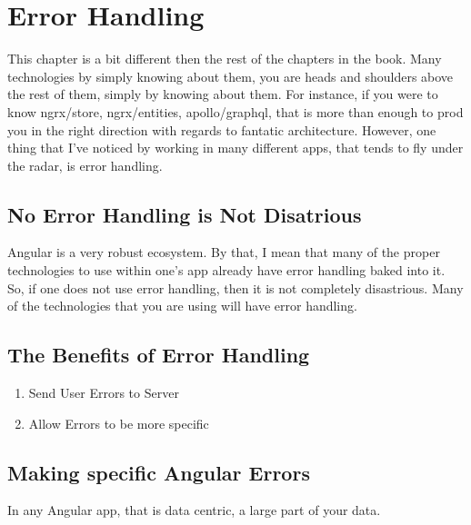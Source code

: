 \maketitle{}
\section{Error Handling}

This chapter is a bit different then the rest of the chapters in the book. Many
technologies by simply knowing about them, you are heads and shoulders above the
rest of them, simply by knowing about them. For instance, if you were to know
ngrx/store, ngrx/entities, apollo/graphql, that is more than enough to prod you
in the right direction with regards to fantatic architecture. However, one thing
that I've noticed by working in many different apps, that tends to fly under
the radar, is error handling.

\subsection{ No Error Handling is Not Disatrious }
Angular is a very robust ecosystem. By that, I mean that many of the proper
technologies to use within one's app already have error handling baked into it.
So, if one does not use error handling, then it is not completely disastrious.
Many of the technologies that you are using will have error handling.

\subsection{ The Benefits of Error Handling }
\begin{enumerate}
  \item Send User Errors to Server
  \item Allow Errors to be more specific
\end{enumerate}

\subsection{ Making specific Angular Errors }
In any Angular app, that is data centric, a large part of your data.
